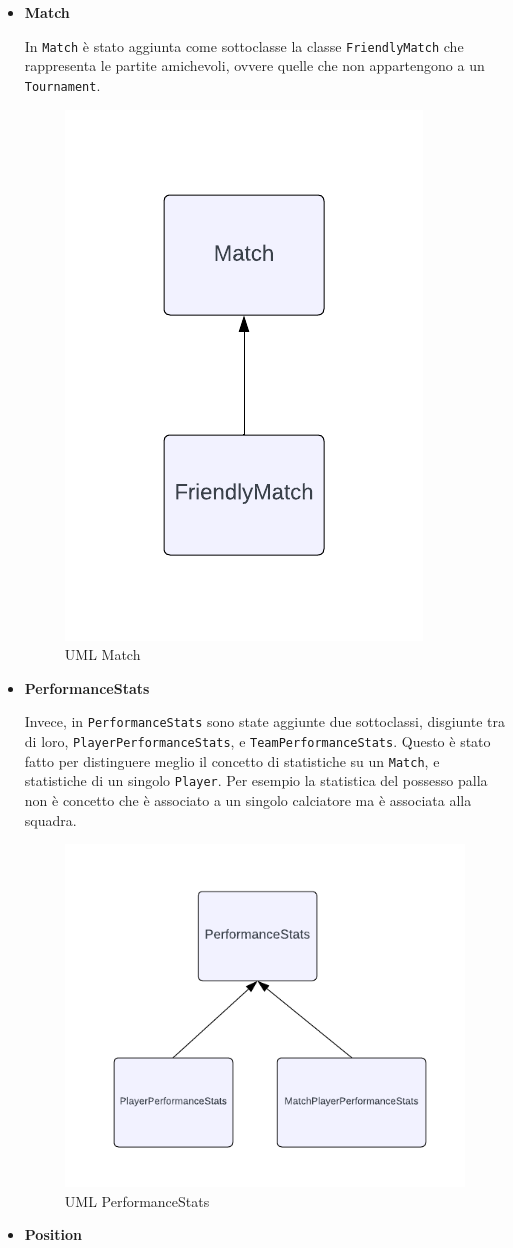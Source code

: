 \documentclass[11pt]{report} %
\begin{document}
 \begin{itemize}
     \item \textbf{Match}

     In \texttt{Match} è stato aggiunta come sottoclasse la  classe \texttt{FriendlyMatch} che rappresenta le partite amichevoli, ovvere quelle che non appartengono a un \texttt{Tournament}.
    \begin{figure}[H]
        \centering
        \includegraphics[width=0.3\linewidth]{MATCH.png}
        \caption{UML Match}
        \label{fig:enter-label}
    \end{figure}
     \item \textbf{PerformanceStats}

     Invece, in \texttt{PerformanceStats} sono state aggiunte due sottoclassi, disgiunte tra di loro, \texttt{PlayerPerformanceStats}, e \texttt{TeamPerformanceStats}. Questo è stato fatto per distinguere meglio il concetto di statistiche su un \texttt{Match}, e statistiche di un singolo \texttt{Player}.
     Per esempio la statistica del possesso palla non è concetto che è associato a un singolo calciatore ma è associata alla squadra.
     \begin{figure}[H]
         \centering
         \includegraphics[width=0.4\linewidth]{STATS.png}
         \caption{UML PerformanceStats}
         \label{fig:enter-label}
     \end{figure}
     \item \textbf{Position}


\end{itemize}
\end{document}
